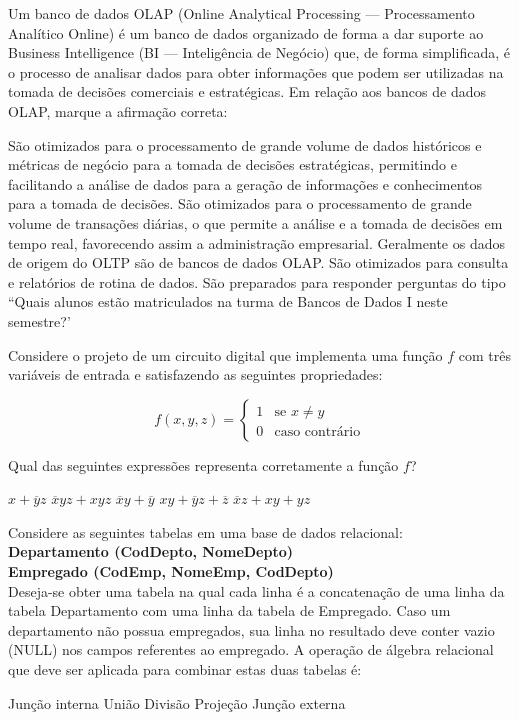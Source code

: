 \documentclass[12pt, addpoints]{exam}
\begin{document}
\begin{questions}
\question
Um banco de dados OLAP (Online Analytical Processing --- Processamento Analítico
Online) é um banco de dados organizado de forma a dar suporte ao Business
Intelligence (BI --- Inteligência de Negócio) que, de forma simplificada, é o
processo de analisar dados para obter informações que podem ser utilizadas na
tomada de decisões comerciais e estratégicas. Em relação aos bancos de dados
OLAP, marque a afirmação correta:
\begin{choices}
\choice São otimizados para o processamento de grande volume de dados históricos e métricas de negócio para a tomada de decisões estratégicas, permitindo e facilitando a análise de dados para a geração de informações e conhecimentos para a tomada de decisões.
\choice São otimizados para o processamento de grande volume de transações diárias, o que permite a análise e a tomada de decisões em tempo real, favorecendo assim a administração empresarial.
\choice Geralmente os dados de origem do OLTP são de bancos de dados OLAP.
\choice São otimizados para consulta e relatórios de rotina de dados.
\choice São preparados para responder perguntas do tipo ``Quais alunos estão matriculados na turma de Bancos de Dados I neste semestre?'
\end{choices}

\question
Considere o projeto de um circuito digital que implementa uma função \( f \) com três variáveis de entrada e satisfazendo as seguintes propriedades:

\[
f(x, y, z) = 
\begin{cases} 
1 & \text{se } x \neq y \\ 
0 & \text{caso contrário} 
\end{cases}
\]

Qual das seguintes expressões representa corretamente a função \( f \)?
\begin{choices}
\choice \( x + \overline{y}z \)
\choice \( \overline{x}y z + x y z \)
\choice \( \overline{x}y + \overline{y} \)
\choice \( xy + \overline{y}z + \overline{z} \)
\choice \( \overline{x}z + xy + yz \)
\end{choices}

\question
Considere as seguintes tabelas em uma base de dados relacional:\\
\textbf{Departamento (CodDepto, NomeDepto)}\\
\textbf{Empregado (CodEmp, NomeEmp, CodDepto)}\\
Deseja-se obter uma tabela na qual cada linha é a concatenação de uma linha da tabela Departamento com uma linha da tabela de Empregado. Caso um departamento não possua empregados, sua linha no resultado deve conter vazio (NULL) nos campos referentes ao empregado. A operação de álgebra relacional que deve ser aplicada para combinar estas duas tabelas é:
\begin{choices}
\choice Junção interna
\choice União
\choice Divisão
\choice Projeção
\choice Junção externa
\end{choices}


\end{questions}
\end{document}
